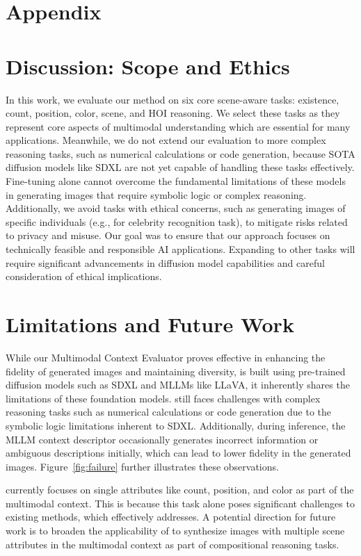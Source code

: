 \appendix
\section*{Appendix}
\section{Discussion: Scope and Ethics}
\label{appendix:scope}
In this work, we evaluate our method on six core scene-aware tasks: existence, count, position, color, scene, and HOI reasoning. We select these tasks as they represent core aspects of multimodal understanding which are essential for many applications. Meanwhile, we do not extend our evaluation to more complex reasoning tasks, such as numerical calculations or code generation, because SOTA diffusion models like SDXL are not yet capable of handling these tasks effectively. Fine-tuning alone cannot overcome the fundamental limitations of these models in generating images that require symbolic logic or complex reasoning. Additionally, we avoid tasks with ethical concerns, such as generating images of specific individuals (e.g., for celebrity recognition task), to mitigate risks related to privacy and misuse. Our goal was to ensure that our approach focuses on technically feasible and responsible AI applications. Expanding to other tasks will require significant advancements in diffusion model capabilities and careful consideration of ethical implications.

\section{Limitations and Future Work}
While our Multimodal Context Evaluator proves effective in enhancing the fidelity of generated images and maintaining diversity, \method is built using pre-trained diffusion models such as SDXL and MLLMs like LLaVA, it inherently shares the limitations of these foundation models. \method still faces challenges with complex reasoning tasks such as numerical calculations or code generation due to the symbolic logic limitations inherent to SDXL. Additionally, during inference, the MLLM context descriptor occasionally generates incorrect information or ambiguous descriptions initially, which can lead to lower fidelity in the generated images. Figure~\ref{fig:failure} further illustrates these observations.

\method currently focuses on single attributes like count, position, and color as part of the multimodal context. This is because this task alone poses significant challenges to existing methods, which \method effectively addresses. A potential direction for future work is to broaden the applicability of \method to synthesize images with multiple scene attributes in the multimodal context as part of compositional reasoning tasks.


